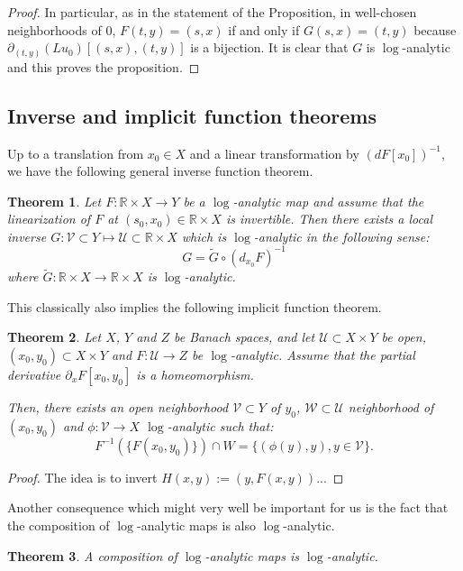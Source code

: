 \documentclass[12pt]{article}
\newtheorem{thm}{Theorem}[section]
\begin{document}
\begin{proof}
        In particular, as in the statement of the Proposition, in well-chosen neighborhoods of $0$, $F(t,y)=(s,x)$ if and only if $ G(s,x)=(t,y)$ because $\partial_{(t,y)}(L u_0)[(s,x),(t,y)]$ is a bijection. It is clear that $G$ is $\log$-analytic and this proves the proposition.
    \end{proof}
    
    
    \subsection{Inverse and implicit function theorems}
    
    Up to a translation from $x_0\in X$ and a linear transformation by $\left(dF[x_0]\right)^{-1}$, we have the following general inverse function theorem.
    
    \begin{thm}\label{inverse fct theorem log}
    		Let $F:\mathbb{R}\times X \to Y$ be a $\log$-analytic map and assume that the linearization of $F$ at $(s_0,x_0)\in \mathbb{R}\times X$ is invertible. Then there exists a local inverse $G: \mathcal{V}\subset Y\mapsto \mathcal{U}\subset\mathbb{R}\times X$ which is $\log$-analytic in the following sense:
    		$$ G = \tilde{G}\circ (d_{x_0}F)^{-1} $$
    		where $\tilde{G}:\mathbb{R}\times X \to \mathbb{R}\times X $ is $\log$-analytic.
    \end{thm}
    
    
    This classically also implies the following implicit function theorem.
    
    \begin{thm}\label{implicit fct theorem log}
         Let $X$, $Y$ and $Z$ be Banach spaces, and let $\mathcal{U}\subset X\times Y$ be open, $(x_0,y_0)\subset X\times Y$ and $F:\mathcal{U}\to Z$ be $\log$-analytic. Assume that the partial derivative $\partial_xF[x_0,y_0]$ is a homeomorphism.
         
         Then, there exists an open neighborhood $\mathcal{V} \subset Y$ of $y_0$, $\mathcal{W}\subset\mathcal{U}$ neighborhood of $(x_0,y_0)$ and $ \phi:\mathcal{V}\to X$ $\log$-analytic such that:
         $$F^{-1}(\{F(x_0,y_0)\})\cap W = \{(\phi(y),y), y\in \mathcal{V} \}.$$
    \end{thm}
    \begin{proof}
    The idea is to invert $H(x,y):=(y,F(x,y))$...
    \end{proof}
    
    Another consequence which might very well be important for us is the fact that the composition of $\log$-analytic maps is also $\log$-analytic.    
    
\begin{thm}\label{composition log}
		A composition of $\log$-analytic maps is $\log$-analytic.
\end{thm}    
    
   
\end{document}
